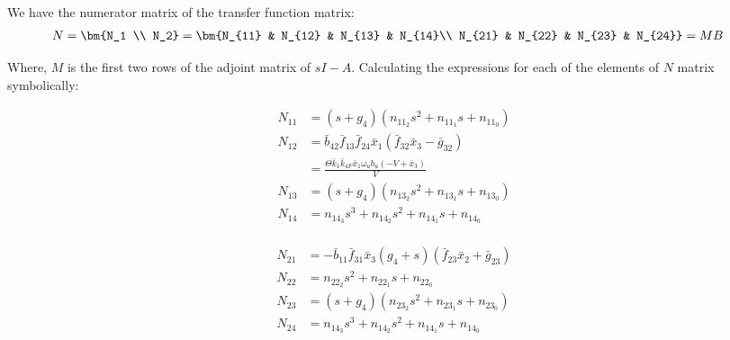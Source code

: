 We have the numerator matrix of the transfer function matrix:
\begin{align*}
    N &= \bm{N_1 \\ N_2} = \bm{N_{11} & N_{12} & N_{13} & N_{14}\\
             N_{21} & N_{22} & N_{23} & N_{24}} = M B
\end{align*}

Where, $M$ is the first two rows of the adjoint matrix of $sI-A$. Calculating
the expressions for each of the elements of $N$ matrix symbolically:

\begin{minipage}{0.49\textwidth}
 \begin{align*}
    N_{11} &= (s + g_4)(n_{11_2} s^2 + n_{11_1} s + n_{11_0})\\
    N_{12} &= \bar b_{42} \bar f_{13} \bar f_{24} \bar x_{1} \left(\bar f_{32} \bar x_{3} - \bar g_{32}\right) \\
    &= \frac{\Theta \bar k_{1} \bar k_{4F} \bar x_{1} \omega_{u} b_{u} \left(- V + \bar x_{3}\right)}{V}\\
    N_{13} &= (s + g_4)(n_{13_2} s^2 + n_{13_1} s + n_{13_0})\\
    N_{14} &= n_{14_3} s^3 + n_{14_2} s^2 + n_{14_1} s + n_{14_0}\\
 \end{align*}
\end{minipage}
\begin{minipage}{0.49\textwidth}
 \begin{align*}
    N_{21} &= - \bar b_{11} \bar f_{31} \bar x_{3} \left(g_{4} + s\right) \left(\bar f_{23} \bar x_{2} + \bar g_{23}\right) \\
    N_{22} &= n_{22_2} s^2 + n_{22_1} s + n_{22_0}\\
    N_{23} &= (s + g_4)(n_{23_2} s^2 + n_{23_1} s + n_{23_0})\\
    N_{24} &= n_{14_3} s^3 + n_{14_2} s^2 + n_{14_1} s + n_{14_0}\\
\end{align*}
\end{minipage}

